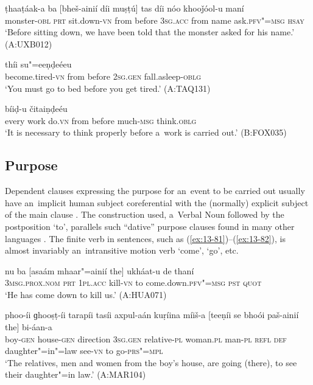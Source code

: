 \begin{exe}
\ex
\label{ex:13-78}
\gll ṭhaaṭáak-a ba [bheš-ainií díi muṣṭú] tas díi nóo khooǰóol-u maní \\
monster-\textsc{obl} \textsc{prt} sit.down-\textsc{vn} from before \textsc{3sg.acc} from name ask.\textsc{pfv"=msg} \textsc{hsay} \\
\glt `Before sitting down, we have been told that the monster asked for his name.' (A:UXB012)

\ex
\label{ex:13-79}
 thíi su"=eeṇḍeéeu  \\
become.tired-\textsc{vn} from before \textsc{2sg.gen} fall.asleep-\textsc{oblg} \\
\glt `You must go to bed before you get tired.' (A:TAQ131)

\ex
\label{ex:13-80}
 bíiḍ-u čitaiṇḍeéu  \\
every work do.\textsc{vn} from before much-\textsc{msg} think.\textsc{oblg} \\
\glt `It is necessary to think properly before a~work is carried out.' (B:FOX035)
\end{exe}

\subsection{Purpose}
\label{subsec:13-4-2}

Dependent clauses expressing the purpose for an~event to be carried out usually have an~implicit human subject coreferential with the (normally) explicit subject of the main clause \citep[337]{givon2001b}. The construction used, a~Verbal Noun followed by the postposition `to', parallels such ``dative'' purpose clauses found in many other languages \citep[251--252]{thompsonetal2007}. The finite verb in sentences, such as (\ref{ex:13-81})--(\ref{ex:13-82}), is almost invariably an~intransitive motion verb `come', `go', etc.

\begin{exe}
\ex
\label{ex:13-81}
\gll nu ba [asaám mhaar"=ainií the] ukháat-u de thaní \\
\textsc{3msg.prox.nom} \textsc{prt} \textsc{1pl.acc} kill-\textsc{vn} to come.down.\textsc{pfv"=msg} \textsc{pst} \textsc{quot}  \\
\glt `He has come down to kill us.' (A:HUA071)

\ex
\label{ex:13-82}
\gll phoo-íi ɡhooṣṭ-íi tarapíi tasíi axpul-aán kuṛíina míiš-a [teeṇíi se bhoói paš-ainií the] bi-áan-a \\
boy-\textsc{gen} house-\textsc{gen} direction \textsc{3sg.gen} relative-\textsc{pl} woman.\textsc{pl}  man-\textsc{pl} \textsc{refl} \textsc{def} daughter"=in"=law see-\textsc{vn} to go-\textsc{prs"=mpl} \\
\glt `The relatives, men and women from the boy's house, are going (there), to see their daughter"=in law.' (A:MAR104) 
\end{exe}

